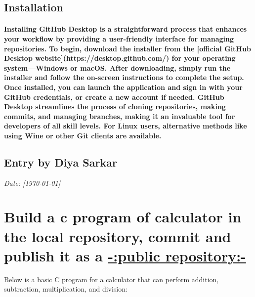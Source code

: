 \documentclass[12pt, a4paper]{article}
\begin{document}
\subsection*{Installation}
\paragraph{Installing GitHub Desktop is a straightforward process that enhances your workflow by providing a user-friendly interface for managing repositories. To begin, download the installer from the [official GitHub Desktop website](https://desktop.github.com/) for your operating system—Windows or macOS. After downloading, simply run the installer and follow the on-screen instructions to complete the setup. Once installed, you can launch the application and sign in with your GitHub credentials, or create a new account if needed. GitHub Desktop streamlines the process of cloning repositories, making commits, and managing branches, making it an invaluable tool for developers of all skill levels. For Linux users, alternative methods like using Wine or other Git clients are available.}


\newpage
{}
\vspace{-2cm}
\subsection*{Entry by Diya Sarkar}
\textit{Date: [\today]}\\
\section*{\LARGE{Build a c program of calculator in the local repository, commit and publish it as a {\underline{-:public repository:-}}}}


\vspace{2 cm}
\Large{Below is a basic C program for a calculator that can perform addition, subtraction, multiplication, and division:}
\vspace{0.5 cm}
\end{document}
